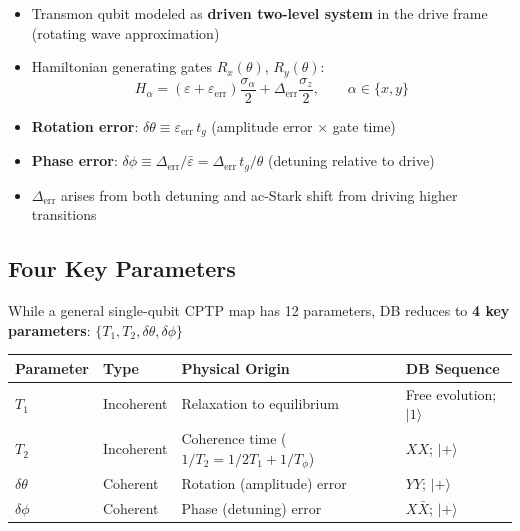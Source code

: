 \documentclass[10pt,a4paper]{article}
\begin{document}
\begin{itemize}
  \item Transmon qubit modeled as \textbf{driven two-level system} in the drive frame (rotating wave approximation)
  \item Hamiltonian generating gates $R_x(\theta)$, $R_y(\theta)$:
  \begin{equation}
    H_\alpha = (\varepsilon + \varepsilon_{\mathrm{err}})\frac{\sigma_\alpha}{2} + \Delta_{\mathrm{err}}\frac{\sigma_z}{2}, \qquad \alpha \in \{x, y\}
  \end{equation}
  \item \textbf{Rotation error}: $\delta\theta \equiv \varepsilon_{\mathrm{err}}\, t_g$ \quad (amplitude error $\times$ gate time)
  \item \textbf{Phase error}: $\delta\phi \equiv \Delta_{\mathrm{err}}/\bar{\varepsilon} = \Delta_{\mathrm{err}}\, t_g / \theta$ \quad (detuning relative to drive)
  \item $\Delta_{\mathrm{err}}$ arises from both detuning and ac-Stark shift from driving higher transitions
\end{itemize}

\subsection{Four Key Parameters}

While a general single-qubit CPTP map has 12 parameters, DB reduces to \textcolor{alertred}{\textbf{4 key parameters}}: $\{T_1, T_2, \delta\theta, \delta\phi\}$

\begin{keybox}
\begin{center}
\begin{tabular}{llll}
\toprule
\textbf{Parameter} & \textbf{Type} & \textbf{Physical Origin} & \textbf{DB Sequence} \\
\midrule
$T_1$ & Incoherent & Relaxation to equilibrium & Free evolution; $|1\rangle$ \\
$T_2$ & Incoherent & Coherence time ($1/T_2 = 1/2T_1 + 1/T_\phi$) & $XX$; $|+\rangle$ \\
$\delta\theta$ & Coherent & Rotation (amplitude) error & $YY$; $|+\rangle$ \\
$\delta\phi$ & Coherent & Phase (detuning) error & $X\bar{X}$; $|+\rangle$ \\
\bottomrule
\end{tabular}
\end{center}
\end{keybox}
\end{document}

